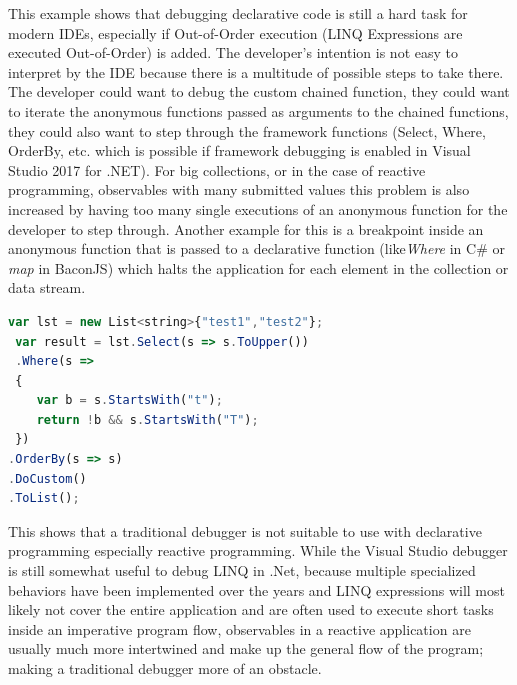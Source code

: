 This example shows that debugging declarative code is still a hard task for modern IDEs, especially if Out-of-Order execution (LINQ Expressions are executed Out-of-Order) is added.
The developer's intention is not easy to interpret by the IDE because there is a multitude of possible steps to take there. The developer could want to debug the custom chained function, they could want to iterate the anonymous functions passed as arguments to the chained functions, they could also want to step through the framework functions (Select, Where, OrderBy, etc. which is possible if framework debugging is enabled in Visual Studio 2017 for .NET). 
For big collections, or in the case of reactive programming, observables with many submitted values this problem is also increased by having too many single executions of an anonymous function for the developer to step through. Another example for this is a breakpoint inside an anonymous function that is passed to a declarative function (like\emph{Where} in C\# or \emph{map} in BaconJS) which halts the application for each element in the collection or data stream.

\begin{lstlisting}[language=JavaScript, caption={Simple example of .NET LINQ in C\# to show the steps the Visual Studio 2017 for .NET debugger takes while debugging step-by-step.},label={lst:CSharp_LINQ}]
 var lst = new List<string>{"test1","test2"};
 var result = lst.Select(s => s.ToUpper())
 .Where(s =>
 {
	var b = s.StartsWith("t");
	return !b && s.StartsWith("T");
 })
.OrderBy(s => s)
.DoCustom()
.ToList();
\end{lstlisting}


This shows that a traditional debugger is not suitable to use with declarative programming especially reactive programming. While the Visual Studio debugger is still somewhat useful to debug LINQ in .Net, because multiple specialized behaviors have been implemented over the years and LINQ expressions will most likely not cover the entire application and are often used to execute short tasks inside an imperative program flow, observables in a reactive application are usually much more intertwined and make up the general flow of the program; making a traditional debugger more of an obstacle.

